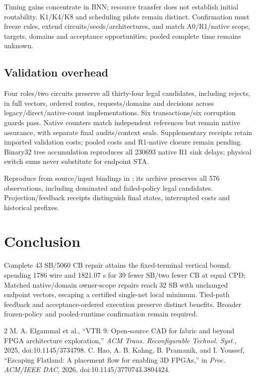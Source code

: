 \documentclass[conference,10pt]{IEEEtran}
\begin{document}
Timing gains concentrate in BNN; resource transfer does not establish initial routability. K1/K4/K8 and scheduling pilots remain distinct. Confirmation must freeze rules, extend circuits/seeds/architectures, and match A0/R1/native scope, targets, domains and acceptance opportunities; pooled complete time remains unknown.

\subsection{Validation overhead}
Four roles/two circuits preserve all thirty-four legal candidates, including rejects, in full vectors, ordered routes, requests/domains and decisions across legacy/direct/native-count implementations. Six transactions/six corruption guards pass. Native counters match independent references but remain native assurance, with separate final audits/context seals. Supplementary receipts retain imported validation costs; pooled costs and R1-native closure remain pending. Binary32 tree accumulation reproduces all 230693 native R1 sink delays; physical switch sums never substitute for endpoint STA.

Reproduce from source/input bindings in ; its archive preserves all 576 observations, including dominated and failed-policy legal candidates. Projection/feedback receipts distinguish final states, interrupted costs and historical prefixes.

\section{Conclusion}
Complete 43 SB/5060 CB repair attains the fixed-terminal vertical bound, spending 1786 wire and 1821.07 s for 39 fewer SB/two fewer CB at equal CPD; Matched native/domain owner-scope repairs reach 32 SB with unchanged endpoint vectors, escaping a certified single-net local minimum. Tied-path feedback and acceptance-ordered execution preserve distinct benefits. Broader frozen-policy and pooled-runtime confirmation remain required.

\begin{thebibliography}{2}
 M. A. Elgammal et al., ``VTR 9: Open-source CAD for fabric and beyond FPGA architecture exploration,'' \emph{ACM Trans. Reconfigurable Technol. Syst.}, 2025, doi:10.1145/3734798.
 C. Hao, A. B. Kahng, B. Pramanik, and I. Youssef, ``Escaping Flatland: A placement flow for enabling 3D FPGAs,'' in \emph{Proc. ACM/IEEE DAC}, 2026, doi:10.1145/3770743.3804424.
\end{thebibliography}
\end{document}

